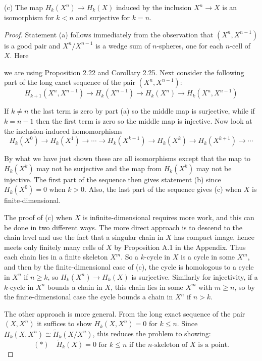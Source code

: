 (c) The map $H_k(X^n) \to H_k(X)$ induced by the inclusion $X^n \to X$ is an isomorphism for $k < n$ and surjective for $k = n$.
\begin{proof}
 Statement (a) follows immediately from the observation that $(X^n, X^{n-1})$ is a good pair and $X^n/X^{n-1}$ is a wedge sum of $n$-spheres, one for each $n$-cell of $X$. Here

we are using Proposition 2.22 and Corollary 2.25. Next consider the following part of
the long exact sequence of the pair $(X^n, X^{n-1})$:
\[
H_{k+1}(X^n, X^{n-1}) \to H_k(X^{n-1}) \to H_k(X^n) \to H_k(X^n, X^{n-1})
\]

If $k \ne n$ the last term is zero by part (a) so the middle map is surjective, while if
$k = n-1$ then the first term is zero so the middle map is injective. Now look at the
inclusion-induced homomorphisms
\[
H_k(X^0) \to H_k(X^1) \to \cdots \to H_k(X^{k-1}) \to H_k(X^k) \to H_k(X^{k+1}) \to \cdots
\]

By what we have just shown these are all isomorphisms except that the map to $H_k(X^k)$
may not be surjective and the map from $H_k(X^k)$ may not be injective. The first part
of the sequence then gives statement (b) since $H_k(X^0) = 0$ when $k > 0$. Also, the last
part of the sequence gives (c) when $X$ is finite-dimensional.

The proof of (c) when $X$ is infinite-dimensional requires more work, and this can
be done in two different ways. The more direct approach is to descend to the chain
level and use the fact that a singular chain in $X$ has compact image, hence meets only
finitely many cells of $X$ by Proposition A.1 in the Appendix. Thus each chain lies
in a finite skeleton $X^m$. So a $k$-cycle in $X$ is a cycle in some $X^m$, and then by the
finite-dimensional case of (c), the cycle is homologous to a cycle in $X^n$ if $n \ge k$, so
$H_k(X^n) \to H_k(X)$ is surjective. Similarly for injectivity, if a $k$-cycle in $X^n$ bounds a
chain in $X$, this chain lies in some $X^m$ with $m \ge n$, so by the finite-dimensional case
the cycle bounds a chain in $X^n$ if $n > k$.

The other approach is more general. From the long exact sequence of the pair
$(X, X^n)$ it suffices to show $H_k(X, X^n) = 0$ for $k \le n$. Since $H_k(X, X^n) \cong \tilde{H}_k(X/X^n)$,
this reduces the problem to showing:
\[
(*) \quad \tilde{H}_k(X) = 0 \text{ for } k \le n \text{ if the } n\text{-skeleton of } X \text{ is a point.}
\]


\end{proof}

